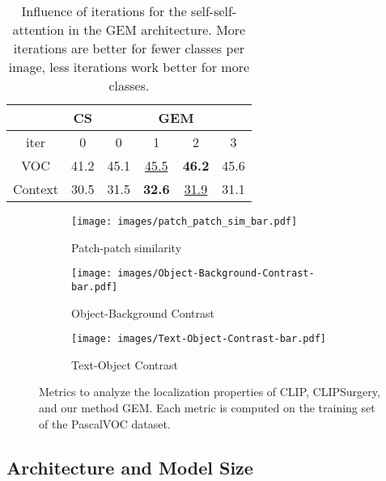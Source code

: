 \documentclass[10pt,twocolumn,letterpaper]{article}
\begin{document}
\begin{table}
\centering
\footnotesize
    \begin{tabular}{c | c | c c c c}
    \toprule 
    & CS & \multicolumn{4}{c}{GEM} \\ \hline
    iter  & 0 & 0& 1 & 2 & 3 \\ 
    \hline
    VOC     & 41.2 & 45.1 & \underline{45.5} & \textbf{46.2} & 45.6 \\ 
    Context & 30.5 & 31.5 & \textbf{32.6} & \underline{31.9} & 31.1\\ 
    \bottomrule
    \end{tabular}
    \caption{Influence of iterations for the self-self-attention in the GEM architecture. More iterations are better for fewer classes per image, less iterations work better for more classes. } \label{tab:iterations}
    \vspace{-5mm}
\end{table}

\begin{figure*}[t]
     \centering
     \begin{subfigure}[b]{0.3\textwidth}
         \centering
         \texttt{[image: images/patch\_patch\_sim\_bar.pdf]}
         \caption{Patch-patch similarity}
         \label{fig:patch-patch-sim}
     \end{subfigure}
     \hfill
     \begin{subfigure}[b]{0.3\textwidth}
         \centering
         \texttt{[image: images/Object-Background-Contrast-bar.pdf]}
         \caption{Object-Background Contrast}
         \label{fig:object-background-contrast}
     \end{subfigure}
     \hfill 
     \begin{subfigure}[b]{0.3\textwidth}
         \centering
         \texttt{[image: images/Text-Object-Contrast-bar.pdf]}
         \caption{Text-Object Contrast}
         \label{fig:text-object-contrast}
     \end{subfigure}
     \vspace{-2mm}
     \caption{Metrics to analyze the localization properties of CLIP, CLIPSurgery, and our method GEM. Each metric is computed on the training set of the PascalVOC dataset.}
     \label{fig:metrics_visual_sim}
     \vspace{-2mm}
\end{figure*}


\subsection{Architecture and Model Size} \label{subsec:arch-size}
\end{document}
